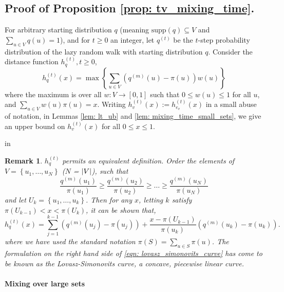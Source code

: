 \documentclass{article}
\DeclarePairedDelimiter\abs{\lvert}{\rvert}
\newcommand{\set}[1]{\left\{#1\right\}}
\newcommand{\1}{\mathbf{1}}
\theoremstyle{aldenthm}
\theoremstyle{aldenrmrk}
\newtheorem{remark}{Remark}
\begin{document}
\subsection{Proof of Proposition \ref{prop: tv_mixing_time}.}
\label{sec: proof_of_proposition_tv_mixing_time}

For arbitrary starting distribution $q$ (meaning $\textrm{supp}(q) \subseteq V$ and $\sum_{u \in V}q(u) = 1$), and for $t \geq 0$ an integer, let $q^{(t)}$ be the $t$-step probability distribution of the lazy random walk with starting distribution $q$. Consider the distance function $h_q^{(t)}, t \geq 0$, 
\begin{equation*}
h_q^{(t)}(x) = \max \left\{ \sum_{u \in V} \left(q^{(m)}(u) - \pi(u)\right)w(u)\right\}
\end{equation*}
where the maximum is over all $w: V \to [0,1]$ such that $0 \leq w(u) \leq 1$ for all $u$, and $\sum_{u \in V} w(u) \pi(u) = x$. Writing $h_v^{(t)}(x) := h_{e_v}^{(t)}(x)$ in a small abuse of notation, in Lemmas \ref{lem: lt_ub} and \ref{lem: mixing_time_small_sets}, we give an upper bound on $h_{v}^{(t)}(x)$ for all $0 \leq x \leq 1$. 

 in
\begin{remark}
	$h_q^{(t)}$ permits an equivalent definition. Order the elements of $V = \set{u_1, \ldots, u_N}$ ($N$ = $\abs{V}$), such that
	\begin{equation*}
	\frac{q^{(m)}(u_1)}{\pi(u_1)} \geq \frac{q^{(m)}(u_2)}{\pi(u_2)} \geq \ldots \geq \frac{q^{(m)}(u_N)}{\pi(u_N)}
	\end{equation*}
	and let $U_k = \set{u_1, \ldots, u_k}$. Then for any $x$, letting $k$ satisfy $\pi(U_{k - 1}) < x < \pi(U_k)$, it can be shown that,
	\begin{equation}
	\label{eqn: lovasz_simonovits_curve}
	h_q^{(t)}(x) = \sum_{j = 1}^{k - 1} (q^{(m)}(u_j) - \pi(u_j)) + \frac{x - \pi(U_{k - 1})}{\pi(u_k)} \left(q^{(m)}(u_k) - \pi(u_k) \right).
	\end{equation}
	where we have used the standard notation $\pi(S) = \sum_{u \in S} \pi(u)$. 
	The formulation on the right hand side of \eqref{eqn: lovasz_simonovits_curve} has come to be known as the \emph{Lovasz-Simonovits curve}, a concave, piecewise linear curve.
\end{remark}

\paragraph{Mixing over large sets}
\end{document}

